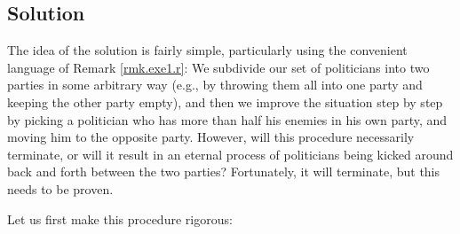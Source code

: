\documentclass[paper=a4, fontsize=12pt]{scrartcl} %
\theoremstyle{plainsl}
\theoremstyle{definition}
\theoremstyle{remark}
\begin{document}
\subsection{Solution}
The idea of the solution is fairly simple, particularly using the
convenient language of Remark \ref{rmk.exe1.r}:
We subdivide our set of
politicians into two parties in some arbitrary way (e.g., by throwing
them all into one party and keeping the other party empty), and then
we improve the situation step by step by picking a politician who has
more than half his enemies in his own party, and moving him to the
opposite party. However, will this procedure necessarily terminate, or
will it result in an eternal process of politicians being kicked
around back and forth between the two parties? Fortunately, it will
terminate, but this needs to be proven.

Let us first make this procedure rigorous:
\end{document}
